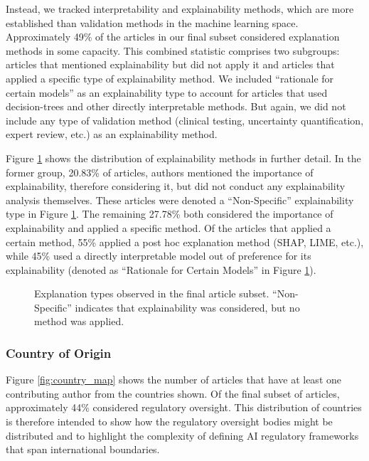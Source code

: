 \documentclass[authoryear,preprint,12pt]{elsarticle}
\begin{document}
Instead, we tracked interpretability and explainability methods, which are more
established than validation methods in the machine learning space. Approximately
49\% of the articles in our final subset considered explanation methods in some
capacity. This combined statistic comprises two subgroups: articles that
mentioned explainability but did not apply it and articles that applied a
specific type of explainability method. We included ``rationale for certain
models'' as an explainability type to account for articles that used
decision-trees and other directly interpretable methods. But again, we did not
include any type of validation method (clinical testing, uncertainty
quantification, expert review, etc.) as an explainability method.

Figure \ref{fig:explain_type} shows the distribution of explainability methods
in further detail. In the former group, 20.83\% of articles, authors mentioned
the importance of explainability, therefore considering it, but did not conduct
any explainability analysis themselves. These articles were denoted a
``Non-Specific'' explainability type in Figure \ref{fig:explain_type}. The
remaining 27.78\% both considered the importance of explainability and applied a
specific method. Of the articles that applied a certain method, 55\% applied a
post hoc explanation method (SHAP, LIME, etc.), while 45\% used a directly
interpretable model out of preference for its explainability (denoted as
``Rationale for Certain Models'' in Figure \ref{fig:explain_type}).

\begin{figure}[ht!]
    \centering
    \resizebox{\textwidth}{!}{}
    \caption{Explanation types observed in the final article subset. ``Non-Specific'' indicates that explainability was considered, but no method was applied.}
    \label{fig:explain_type}
\end{figure}
\FloatBarrier

\subsubsection{Country of Origin}
Figure \ref{fig:country_map} shows the number of articles that have at least one
contributing author from the countries shown. Of the final subset of articles,
approximately 44\% considered regulatory oversight. This distribution of
countries is therefore intended to show how the regulatory oversight bodies
might be distributed and to highlight the complexity of defining AI regulatory
frameworks that span international boundaries. 
\end{document}

